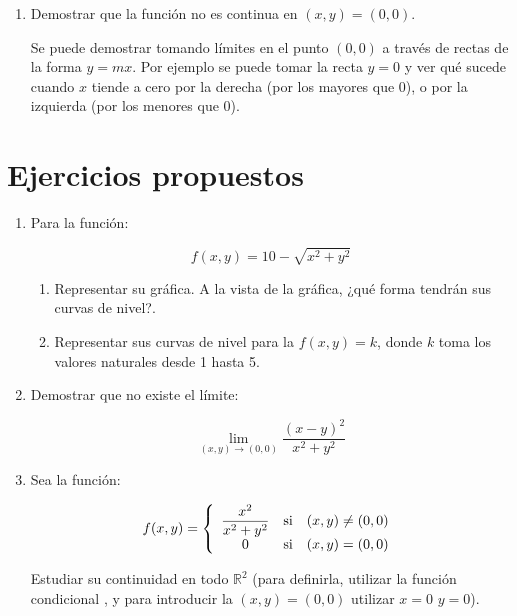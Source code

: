 \begin{enumerate}[leftmargin=*]
\begin{enumerate}
  \item Demostrar que la función no es continua en $(x,y)=(0,0)$.

\begin{indicacion}
{Se puede demostrar tomando límites en el punto $(0,0)$ a través
de rectas de la forma $y=mx$. Por ejemplo se puede tomar la recta
$y=0$ y ver qué sucede cuando $x$ tiende a cero por la derecha
(por los mayores que 0), o por la izquierda (por los menores que
0).


}
\end{indicacion}


\end{enumerate}
\end{enumerate}


\section{Ejercicios propuestos}
\begin{enumerate}

\item Para la función:

\[
f(x,y) = 10 - \sqrt {x^2  + y^2 }
\]

\begin{enumerate}
\item Representar su gráfica. A la vista de la gráfica, ¿qué forma
tendrán sus curvas de nivel?.

\item Representar sus curvas de nivel para la $f(x,y)=k$, donde
$k$ toma los valores naturales desde 1 hasta 5.
\end{enumerate}

\item Demostrar que no existe el límite:

\[
\mathop {\lim }\limits_{\left( {x,y} \right) \to \left( {0,0}
\right)} \frac{{\left( {x - y} \right)^2 }} {{x^2  + y^2 }}
\]

\item Sea la función:

\[
f(x,y) = \left\{ {\begin{array}{*{20}c}
   {\dfrac{{x^2 }}
{{x^2  + y^2 }}} & {\text{si}} & {\left( {x,y} \right) \ne \left( {0,0} \right)}  \\
   0 & {\text{si}} & {\left( {x,y} \right) = \left( {0,0} \right)}  \\

 \end{array} } \right.
\]

Estudiar su continuidad en todo $\mathbb{R}^2$ (para definirla,
utilizar la función condicional , y para introducir la
 $(x,y)=(0,0)$ utilizar $x=0$ 
$y=0$).
\end{enumerate}